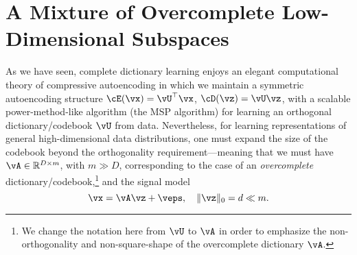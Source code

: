 \documentclass[\toplevelprefix/book-main.tex]{subfiles}
\begin{document}
%

\section{A Mixture of Overcomplete Low-Dimensional  Subspaces}
\label{sec:dictionary_learning}
As we have seen, complete dictionary learning enjoys an elegant computational theory of compressive autoencoding in which we maintain a symmetric autoencoding structure $\cE(\vx) = \vU^\top \vx$, $\cD(\vz) = \vU \vz$, with a scalable power-method-like algorithm (the MSP algorithm) for learning an orthogonal dictionary/codebook $\vU$ from data. Nevertheless, for learning representations of general high-dimensional data distributions, one must expand the size of the codebook beyond the orthogonality requirement---meaning that we must have $\vA \in \R^{D \times m}$, with $m \gg D$, corresponding to the case of an \textit{overcomplete} dictionary/codebook,\footnote{We change the notation here from $\vU$ to $\vA$ in order to emphasize the non-orthogonality and non-square-shape of the overcomplete dictionary $\vA$.} and the signal model
\begin{equation}\label{eq:model-DL-overcomplete}
    \vx =  \vA \vz + \veps,
    \quad
    \norm{\vz}_0 = d \ll m.
\end{equation}
\end{document}

